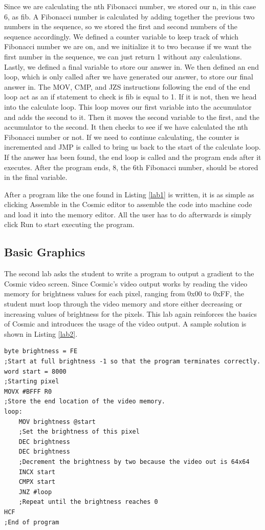 \documentclass[conference]{IEEEtran}
\begin{document}
Since we are calculating the nth Fibonacci number, we stored our n, in this case 6, as fib. A Fibonacci number is calculated by adding together the previous two numbers in the sequence, so we stored the first and second numbers of the sequence accordingly. We defined a counter variable to keep track of which Fibonacci number we are on, and we initialize it to two because if we want the first number in the sequence, we can just return 1 without any calculations. Lastly, we defined a final variable to store our answer in. We then defined an end loop, which is only called after we have generated our answer, to store our final answer in. The MOV, CMP, and JZS instructions following the end of the end loop act as an if statement to check is fib is equal to 1. If it is not, then we head into the calculate loop. This loop moves our first variable into the accumulator and adds the second to it. Then it moves the second variable to the first, and the accumulator to the second. It then checks to see if we have calculated the nth Fibonacci number or not. If we need to continue calculating, the counter is incremented and JMP is called to bring us back to the start of the calculate loop. If the answer has been found, the end loop is called and the program ends after it executes. After the program ends, 8, the 6th Fibonacci number, should be stored in the final variable.

After a program like the one found in Listing \ref{lab1} is written, it is as simple as clicking Assemble in the Cosmic editor to assemble the code into machine code and load it into the memory editor. All the user has to do afterwards is simply click Run to start executing the program.

\subsection{Basic Graphics}
The second lab asks the student to write a program to output a gradient to the Cosmic video screen. Since Cosmic's video output works by reading the video memory for brightness values for each pixel, ranging from 0x00 to 0xFF, the student must loop through the video memory and store either decreasing or increasing values of brightness for the pixels. This lab again reinforces the basics of Cosmic and introduces the usage of the video output. A sample solution is shown in Listing \ref{lab2}.

\begin{lstlisting}[caption={Cosmic assembly to output a gradient to the video screen.}, label = {lab2}]
byte brightness = FE
;Start at full brightness -1 so that the program terminates correctly.
word start = 8000
;Starting pixel
MOVX #BFFF R0
;Store the end location of the video memory.
loop:
	MOV brightness @start
	;Set the brightness of this pixel
	DEC brightness
    DEC brightness
    ;Decrement the brightness by two because the video out is 64x64
	INCX start
	CMPX start
	JNZ #loop
	;Repeat until the brightness reaches 0
HCF
;End of program
\end{lstlisting}
\end{document}
